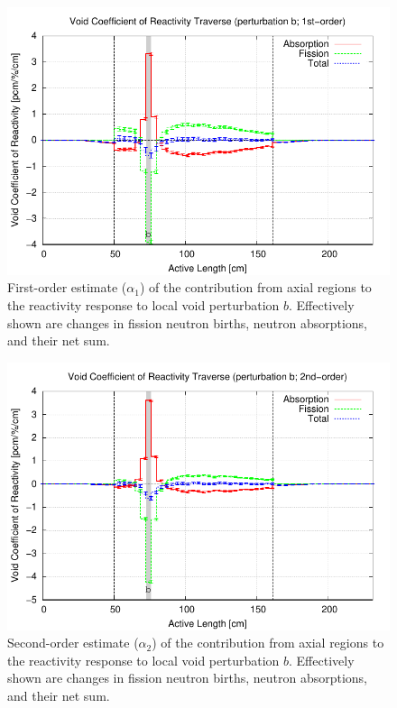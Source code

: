 \documentclass[11pt]{article}
\begin{document}
\clearpage
\begin{figure}[p]
  \centering
  \includegraphics[width=\textwidth, trim=0 0 0 0.275in, clip]{./img/Th-b-TraverseAlpha1.pdf}
  \caption{First-order estimate ($\alpha_1$) of the contribution from axial regions to the reactivity response to local void perturbation $b$. Effectively shown are changes in fission neutron births, neutron absorptions, and their net sum.}
  \label{fig:alpha1R}
\end{figure}

\clearpage
\begin{figure}[p]
  \centering
  \includegraphics[width=\textwidth, trim=0 0 0 0.275in, clip]{./img/Th-b-TraverseAlpha2.pdf}
  \caption{Second-order estimate ($\alpha_2$) of the contribution from axial regions to the reactivity response to local void perturbation $b$. Effectively shown are changes in fission neutron births, neutron absorptions, and their net sum.}
  \label{fig:alpha2R}
\end{figure}
\end{document}
